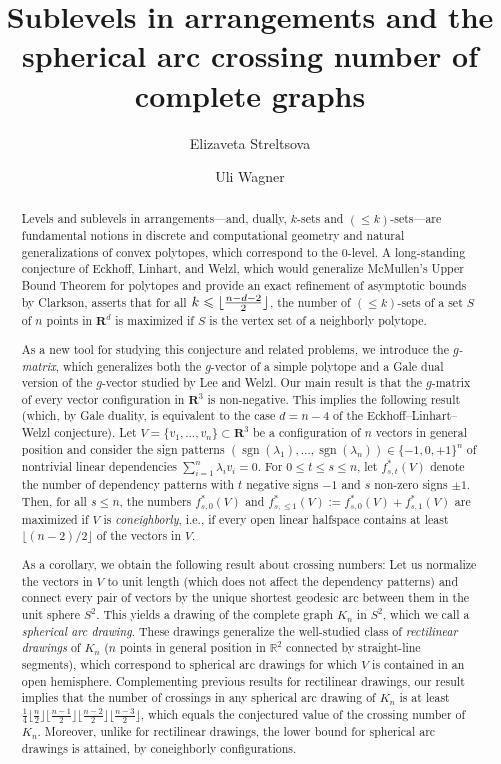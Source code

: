 \documentclass[a4paper,USenglish,cleveref, autoref, thm-restate,nolineno]{socg-lipics-v2021}
\title{Sublevels in arrangements and the spherical arc crossing number of complete graphs} %
\author{Elizaveta Streltsova}{ISTA, Klosterneuburg, Austria}{estrelts@ist.ac.at
}{}{}%
\author{Uli Wagner}{ISTA, Klosterneuburg, Austria \and \url{https://ist.ac.at/en/research/wagner-group/}}{uli@ist.ac.at}{https://orcid.org/0000-0002-1494-0568}{}
\DeclareMathOperator{\sgn}{sgn}
\renewcommand{\leq}{\leqslant}
\newcommand{\R}{\mathbb{R}}
\DeclarePairedDelimiter\floor{\lfloor}{\rfloor}
\begin{document}
\maketitle
\thispagestyle{empty}

\begin{abstract}
Levels and sublevels in arrangements---and, dually, $k$-sets and $(\leq k)$-sets---are fundamental notions in discrete and computational geometry and natural generalizations of convex polytopes, which  correspond to the $0$-level. A long-standing conjecture of Eckhoff, Linhart, and Welzl, which would generalize McMullen's Upper Bound Theorem for polytopes and provide an exact refinement of asymptotic bounds by Clarkson, asserts that for all $k\leq \floor{\frac{n-d-2}{2}}$, the number of $(\leq k)$-sets of a set $S$ of $n$ points in $\mathbf{R}^d$ is maximized if $S$ is the vertex set of a neighborly polytope.

As a new tool for studying this conjecture and related problems, we introduce the \emph{$g$-matrix}, which generalizes both the $g$-vector of a simple polytope and a Gale dual version of the $g$-vector studied by Lee and Welzl. Our main result is that the $g$-matrix of every vector configuration in $\mathbf{R}^3$ is non-negative. This implies the following result (which, by Gale duality, is equivalent to the case $d=n-4$ of the Eckhoff--Linhart--Welzl conjecture). 
Let $V=\{v_1,\dots,v_n\} \subset \mathbf{R}^3$ be a configuration 
of $n$ vectors in general position and consider the sign patterns $(\sgn(\lambda_1),\dots,\sgn(\lambda_n))\in \{-1,0,+1\}^n$ of nontrivial linear dependencies $\sum_{i=1}^n \lambda_i v_i=0$.
For $0\leq t \leq s \leq n$, let $f^*_{s,t}(V)$ denote the number of dependency patterns with $t$ negative signs $-1$ and $s$ non-zero signs $\pm 1$. Then, for all $s\leq n$, the numbers $f^*_{s,0}(V)$ and $f^*_{s,\leq 1}(V):=f^*_{s,0}(V)+f^*_{s,1}(V)$ are maximized if $V$ is \emph{coneighborly}, i.e., if every open linear halfspace contains at least $\lfloor (n-2)/2 \rfloor$ of the vectors in $V$.

As a corollary, we obtain the following result about crossing numbers: Let us normalize the vectors in $V$ to unit length (which does not affect the dependency patterns) and connect every pair of vectors by the unique shortest geodesic arc between them in the unit sphere $S^2$. This yields a drawing of the complete graph $K_n$ in $S^2$, which we call a \emph{spherical arc drawing}. These drawings generalize the well-studied class of \emph{rectilinear drawings} of $K_n$ ($n$ points in general position in $\R^2$ connected by straight-line segments), which correspond to spherical arc drawings for which $V$ is contained in an open hemisphere. Complementing previous results for rectilinear drawings, our result implies that the number of crossings in any spherical arc drawing of $K_n$ is at least $\frac{1}{4}\lfloor \frac{n}{2}\rfloor \lfloor \frac{n-1}{2}\rfloor \lfloor \frac{n-2}{2}\rfloor \lfloor \frac{n-3}{2}\rfloor$, which equals the conjectured value of the crossing number of $K_n$. Moreover, unlike for rectilinear drawings, the lower bound for spherical arc drawings is attained, by coneighborly configurations.
\end{abstract}
\end{document}
